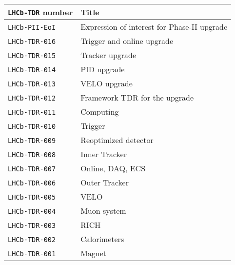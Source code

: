 \begin{center}
  \begin{tabular}{ll}
    \toprule
    \texttt{LHCb-TDR} number & Title \\
    \midrule
    \texttt{LHCb-PII-EoI}~\cite{LHCb-PII-EoI} &
    {\small Expression of interest for Phase-II upgrade} \\
    \texttt{LHCb-TDR-016}~\cite{LHCb-TDR-016} &
    {\small Trigger and online upgrade} \\
    \texttt{LHCb-TDR-015}~\cite{LHCb-TDR-015} &
    {\small Tracker upgrade} \\
    \texttt{LHCb-TDR-014}~\cite{LHCb-TDR-014} &
    {\small PID upgrade} \\
    \texttt{LHCb-TDR-013}~\cite{LHCb-TDR-013} &
    {\small VELO upgrade} \\
    \texttt{LHCb-TDR-012}~\cite{LHCb-TDR-012} &
    {\small Framework TDR for the upgrade} \\
    \texttt{LHCb-TDR-011}~\cite{LHCb-TDR-011} &
    {\small Computing} \\
    \texttt{LHCb-TDR-010}~\cite{LHCb-TDR-010} &
    {\small Trigger} \\
    \texttt{LHCb-TDR-009}~\cite{LHCb-TDR-009} &
    {\small Reoptimized detector} \\
    \texttt{LHCb-TDR-008}~\cite{LHCb-TDR-008} &
    {\small Inner Tracker} \\
    \texttt{LHCb-TDR-007}~\cite{LHCb-TDR-007} &
    {\small Online, DAQ, ECS} \\
    \texttt{LHCb-TDR-006}~\cite{LHCb-TDR-006} &
    {\small Outer Tracker} \\
    \texttt{LHCb-TDR-005}~\cite{LHCb-TDR-005} &
    {\small VELO} \\
    \texttt{LHCb-TDR-004}~\cite{LHCb-TDR-004} &
    {\small Muon system} \\
    \texttt{LHCb-TDR-003}~\cite{LHCb-TDR-003} &
    {\small RICH} \\
    \texttt{LHCb-TDR-002}~\cite{LHCb-TDR-002} &
    {\small Calorimeters} \\
    \texttt{LHCb-TDR-001}~\cite{LHCb-TDR-001} &
    {\small Magnet} \\
    \bottomrule
  \end{tabular}
\end{center}


